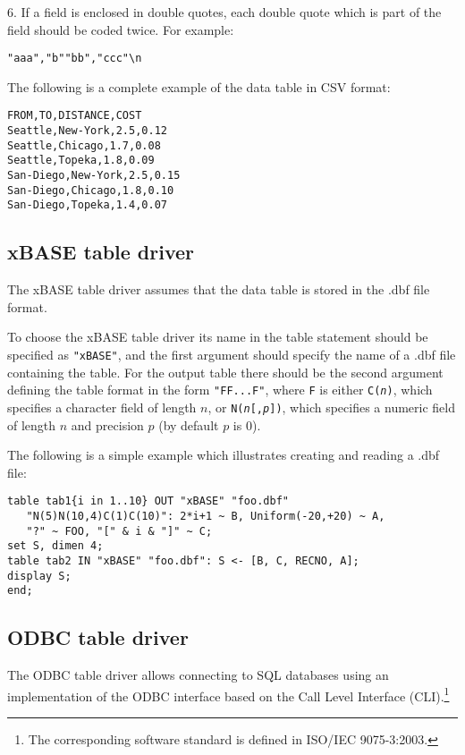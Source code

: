 \documentclass[11pt,draft]{article}
\begin{document}
6. If a field is enclosed in double quotes, each double quote which is
part of the field should be coded twice. For example:

\begin{verbatim}
"aaa","b""bb","ccc"\n
\end{verbatim}

The following is a complete example of the data table in CSV format:

\begin{verbatim}
FROM,TO,DISTANCE,COST
Seattle,New-York,2.5,0.12
Seattle,Chicago,1.7,0.08
Seattle,Topeka,1.8,0.09
San-Diego,New-York,2.5,0.15
San-Diego,Chicago,1.8,0.10
San-Diego,Topeka,1.4,0.07
\end{verbatim}

\subsection*{xBASE table driver}

The xBASE table driver assumes that the data table is stored in the
.dbf file format.

To choose the xBASE table driver its name in the table statement should
be specified as \verb|"xBASE"|, and the first argument should specify
the name of a .dbf file containing the table. For the output table there
should be the second argument defining the table format in the form
\verb|"FF...F"|, where \verb|F| is either {\tt C({\it n})},
which specifies a character field of length $n$, or
{\tt N({\it n}{\rm [},{\it p}{\rm ]})}, which specifies a numeric field
of length $n$ and precision $p$ (by default $p$ is 0).

The following is a simple example which illustrates creating and
reading a .dbf file:

\begin{verbatim}
table tab1{i in 1..10} OUT "xBASE" "foo.dbf"
   "N(5)N(10,4)C(1)C(10)": 2*i+1 ~ B, Uniform(-20,+20) ~ A,
   "?" ~ FOO, "[" & i & "]" ~ C;
set S, dimen 4;
table tab2 IN "xBASE" "foo.dbf": S <- [B, C, RECNO, A];
display S;
end;
\end{verbatim}

\subsection*{ODBC table driver}

The ODBC table driver allows connecting to SQL databases using an
implementation of the ODBC interface based on the Call Level Interface
(CLI).\footnote{The corresponding software standard is defined in
ISO/IEC 9075-3:2003.}
\end{document}
